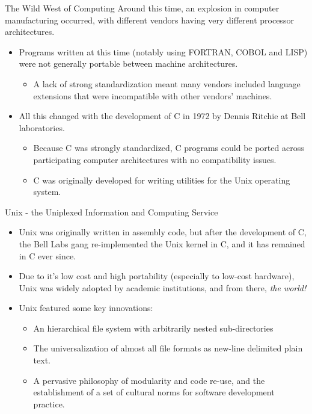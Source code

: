 \documentclass[11pt]{beamer}
\begin{document}
\begin{frame}{The Wild West of Computing}
Around this time, an explosion in computer manufacturing occurred, with different vendors having very different processor architectures.  
\begin{itemize}
\item Programs written at this time (notably using FORTRAN, COBOL and LISP) were not generally portable between machine architectures.
\begin{itemize}
\item A lack of strong standardization meant many vendors included language extensions that were incompatible with other vendors' machines.  
\end{itemize}
\item All this changed with the development of C in 1972 by Dennis Ritchie at Bell laboratories.
\begin{itemize}
\item Because C was strongly standardized, C programs could be ported across participating computer architectures with no compatibility issues.
\item C was originally developed for writing utilities for the Unix operating system.
\end{itemize}
\end{itemize}
\end{frame}

\begin{frame}{Unix - the Uniplexed Information and Computing Service}
\begin{itemize}
\item Unix was originally written in assembly code, but after the development of C, the Bell Labs gang re-implemented the Unix kernel in C, and it has remained in C ever since.  
\item Due to it's low cost and high portability (especially to low-cost hardware), Unix was widely adopted by academic institutions, and from there, \emph{the world!}
\item Unix featured some key innovations: 
\begin{itemize}
\item An hierarchical file system with arbitrarily nested sub-directories
\item The universalization of almost all file formats as new-line delimited plain text.  
\item A pervasive philosophy of modularity and code re-use, and the establishment of a set of cultural norms for software development practice.   
\end{itemize}
\end{itemize}
\end{frame}
\end{document}
